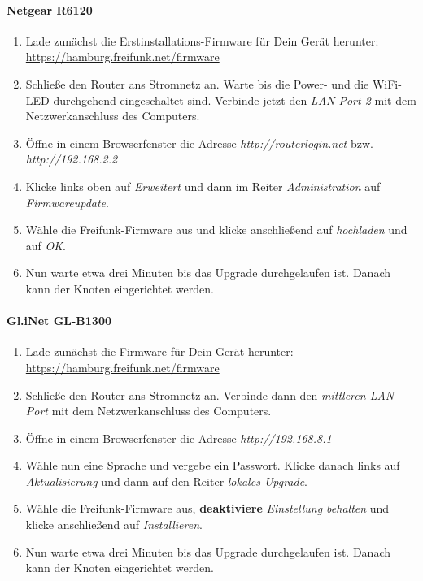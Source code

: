 \documentclass[10pt,a4paper,notumble]{leaflet}
\begin{document}
\paragraph{Netgear R6120}
\begin{enumerate}
 \item Lade zunächst die Erstinstallations-Firmware für Dein Gerät herunter: \href{https://hamburg.freifunk.net/firmware}{https://hamburg.freifunk.net/firmware}
 \item Schließe den Router ans Stromnetz an. Warte bis die Power- und die WiFi-LED durchgehend eingeschaltet sind. Verbinde jetzt den \textit{LAN-Port 2} mit dem Netzwerkanschluss des Computers.
 \item Öffne in einem Browserfenster die Adresse \textit{http://routerlogin.net} bzw. \textit{http://192.168.2.2}
 \item Klicke links oben auf \textit{Erweitert} und dann im Reiter \textit{Administration} auf \textit{Firmwareupdate}.
 \item Wähle die Freifunk-Firmware aus und klicke anschließend auf \textit{hochladen} und auf \textit{OK}.
 \item Nun warte etwa drei Minuten bis das Upgrade durchgelaufen ist. Danach kann der Knoten eingerichtet werden.
\end{enumerate}


\paragraph{Gl.iNet GL-B1300}
\begin{enumerate}
 \item Lade zunächst die Firmware für Dein Gerät herunter: \href{https://hamburg.freifunk.net/firmware}{https://hamburg.freifunk.net/firmware}
 \item Schließe den Router ans Stromnetz an. Verbinde dann den \textit{mittleren LAN-Port} mit dem Netzwerkanschluss des Computers.
 \item Öffne in einem Browserfenster die Adresse \textit{http://192.168.8.1}
 \item Wähle nun eine Sprache und vergebe ein Passwort. Klicke danach links auf \textit{Aktualisierung} und dann auf den Reiter \textit{lokales Upgrade}.
 \item Wähle die Freifunk-Firmware aus, \textbf{deaktiviere} \textit{Einstellung behalten} und klicke anschließend auf \textit{Installieren}.
 \item Nun warte etwa drei Minuten bis das Upgrade durchgelaufen ist. Danach kann der Knoten eingerichtet werden.
\end{enumerate}
\end{document}
